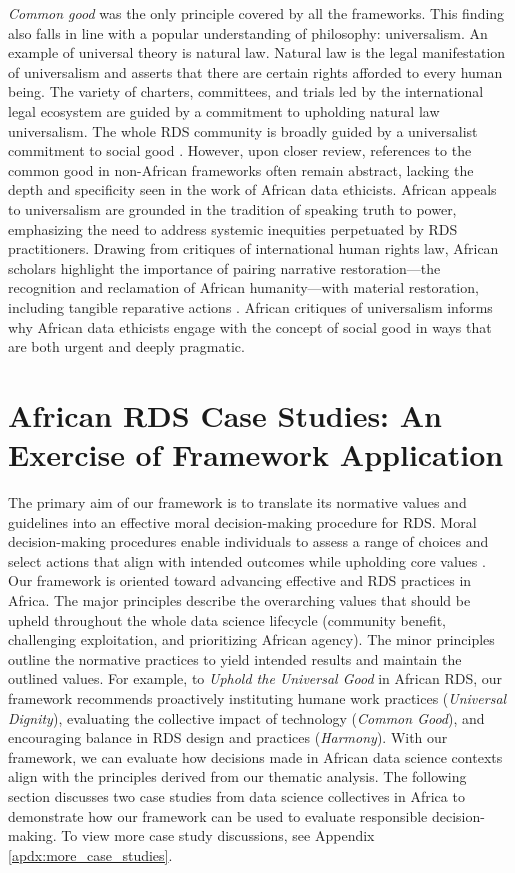 \textit{Common good} was the only principle covered by all the frameworks. This finding also falls in line with a popular understanding of philosophy: universalism. An example of universal theory is natural law. Natural law is the legal manifestation of universalism and asserts that there are certain rights afforded to every human being\cite{gordon2022universalism}. The variety of charters, committees, and trials led by the international legal ecosystem are guided by a commitment to upholding natural law universalism. 
The whole RDS community is broadly guided by a universalist commitment to social good \cite{floridi2018ai4people}. However, upon closer review, references to the common good in non-African frameworks often remain abstract, lacking the depth and specificity seen in the work of African data ethicists.
African appeals to universalism are grounded in the tradition of speaking truth to power, emphasizing the need to address systemic inequities perpetuated by RDS practitioners. 
Drawing from critiques of international human rights law, African scholars highlight the importance of pairing narrative restoration—the recognition and reclamation of African humanity—with material restoration, including tangible reparative actions \cite{biko2004black, oyowe2014african, gordon2022universalism}. African critiques of universalism informs why African data ethicists engage with the concept of social good in ways that are both urgent and deeply pragmatic. 


\section{African RDS Case Studies: An Exercise of Framework Application}
The primary aim of our framework is to translate its normative values and guidelines into an effective moral decision-making procedure for RDS. Moral decision-making procedures enable individuals to assess a range of choices and select actions that align with intended outcomes while upholding core values \cite{smith2022making}. Our framework is oriented toward advancing effective and RDS practices in Africa. The major principles describe the overarching values that should be upheld throughout the whole data science lifecycle (community benefit, challenging exploitation, and prioritizing African agency). The minor principles outline the normative practices to yield intended results and maintain the outlined values. For example, to \textit{Uphold the Universal Good} in African RDS, our framework recommends proactively instituting humane work practices (\textit{Universal Dignity}), evaluating the collective impact of technology (\textit{Common Good}), and encouraging balance in RDS design and practices (\textit{Harmony}). With our framework, we can evaluate how decisions made in African data science contexts align with the principles derived from our thematic analysis. The following section discusses two case studies from data science collectives in Africa to demonstrate how our framework can be used to evaluate responsible decision-making.
To view more case study discussions, see Appendix \ref{apdx:more_case_studies}. 

